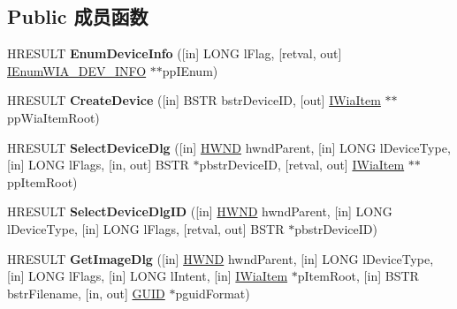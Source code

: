 \subsection*{Public 成员函数}
\begin{DoxyCompactItemize}
\item 
\mbox{\label{interface_i_wia_dev_mgr_a983860b561b4c6812d5876fcfc8044d1}} 
H\+R\+E\+S\+U\+LT {\bfseries Enum\+Device\+Info} (\mbox{[}in\mbox{]} L\+O\+NG l\+Flag, \mbox{[}retval, out\mbox{]} \hyperlink{interface_i_enum_w_i_a___d_e_v___i_n_f_o}{I\+Enum\+W\+I\+A\+\_\+\+D\+E\+V\+\_\+\+I\+N\+FO} $\ast$$\ast$pp\+I\+Enum)
\item 
\mbox{\label{interface_i_wia_dev_mgr_ae235ce2162d6f84260fdb5be717b74f0}} 
H\+R\+E\+S\+U\+LT {\bfseries Create\+Device} (\mbox{[}in\mbox{]} B\+S\+TR bstr\+Device\+ID, \mbox{[}out\mbox{]} \hyperlink{interface_i_wia_item}{I\+Wia\+Item} $\ast$$\ast$pp\+Wia\+Item\+Root)
\item 
\mbox{\label{interface_i_wia_dev_mgr_a072198383dd81cc7588d9ac4d2e952cd}} 
H\+R\+E\+S\+U\+LT {\bfseries Select\+Device\+Dlg} (\mbox{[}in\mbox{]} \hyperlink{interfacevoid}{H\+W\+ND} hwnd\+Parent, \mbox{[}in\mbox{]} L\+O\+NG l\+Device\+Type, \mbox{[}in\mbox{]} L\+O\+NG l\+Flags, \mbox{[}in, out\mbox{]} B\+S\+TR $\ast$pbstr\+Device\+ID, \mbox{[}retval, out\mbox{]} \hyperlink{interface_i_wia_item}{I\+Wia\+Item} $\ast$$\ast$pp\+Item\+Root)
\item 
\mbox{\label{interface_i_wia_dev_mgr_ad27b97b1d79f18d23c20460625012f9b}} 
H\+R\+E\+S\+U\+LT {\bfseries Select\+Device\+Dlg\+ID} (\mbox{[}in\mbox{]} \hyperlink{interfacevoid}{H\+W\+ND} hwnd\+Parent, \mbox{[}in\mbox{]} L\+O\+NG l\+Device\+Type, \mbox{[}in\mbox{]} L\+O\+NG l\+Flags, \mbox{[}retval, out\mbox{]} B\+S\+TR $\ast$pbstr\+Device\+ID)
\item 
\mbox{\label{interface_i_wia_dev_mgr_a1ef2e294c2a16f4434c3218e2864a185}} 
H\+R\+E\+S\+U\+LT {\bfseries Get\+Image\+Dlg} (\mbox{[}in\mbox{]} \hyperlink{interfacevoid}{H\+W\+ND} hwnd\+Parent, \mbox{[}in\mbox{]} L\+O\+NG l\+Device\+Type, \mbox{[}in\mbox{]} L\+O\+NG l\+Flags, \mbox{[}in\mbox{]} L\+O\+NG l\+Intent, \mbox{[}in\mbox{]} \hyperlink{interface_i_wia_item}{I\+Wia\+Item} $\ast$p\+Item\+Root, \mbox{[}in\mbox{]} B\+S\+TR bstr\+Filename, \mbox{[}in, out\mbox{]} \hyperlink{interface_g_u_i_d}{G\+U\+ID} $\ast$pguid\+Format)
$$
\end{DoxyCompactItemize}
